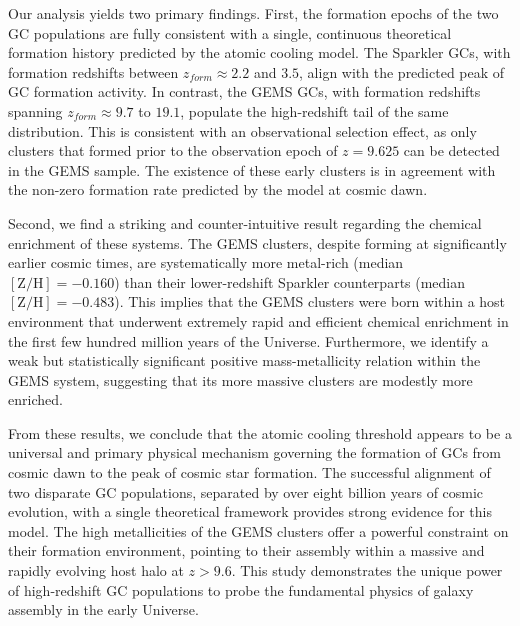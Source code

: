 \documentclass[]{article}
\begin{document}
Our analysis yields two primary findings. First, the formation epochs of the two GC populations are fully consistent with a single, continuous theoretical formation history predicted by the atomic cooling model. The Sparkler GCs, with formation redshifts between $z_{form} \approx 2.2$ and $3.5$, align with the predicted peak of GC formation activity. In contrast, the GEMS GCs, with formation redshifts spanning $z_{form} \approx 9.7$ to $19.1$, populate the high-redshift tail of the same distribution. This is consistent with an observational selection effect, as only clusters that formed prior to the observation epoch of $z=9.625$ can be detected in the GEMS sample. The existence of these early clusters is in agreement with the non-zero formation rate predicted by the model at cosmic dawn.

Second, we find a striking and counter-intuitive result regarding the chemical enrichment of these systems. The GEMS clusters, despite forming at significantly earlier cosmic times, are systematically more metal-rich (median $[\mathrm{Z/H}] = -0.160$) than their lower-redshift Sparkler counterparts (median $[\mathrm{Z/H}] = -0.483$). This implies that the GEMS clusters were born within a host environment that underwent extremely rapid and efficient chemical enrichment in the first few hundred million years of the Universe. Furthermore, we identify a weak but statistically significant positive mass-metallicity relation within the GEMS system, suggesting that its more massive clusters are modestly more enriched.

From these results, we conclude that the atomic cooling threshold appears to be a universal and primary physical mechanism governing the formation of GCs from cosmic dawn to the peak of cosmic star formation. The successful alignment of two disparate GC populations, separated by over eight billion years of cosmic evolution, with a single theoretical framework provides strong evidence for this model. The high metallicities of the GEMS clusters offer a powerful constraint on their formation environment, pointing to their assembly within a massive and rapidly evolving host halo at $z>9.6$. This study demonstrates the unique power of high-redshift GC populations to probe the fundamental physics of galaxy assembly in the early Universe.


{}

\end{document}
